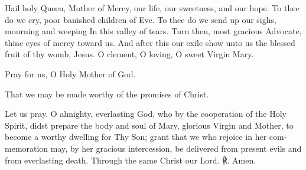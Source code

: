 \begin{otherlanguage}{english}\noindent Hail holy Queen, Mother of Mercy, 
our life, our sweetness, and our hope. 
To thee do we cry, poor banished children of Eve. 
To thee do we send up our sighs, mourning and weeping 
In this valley of tears. Turn then, most gracious Advocate, 
thine eyes of mercy toward us. 
And after this our exile show unto us 
the blessed fruit of thy womb, Jesus.
O clement, O loving, O sweet Virgin Mary.

\noindent \vv Pray for us, O Holy Mother of God.

\noindent \rr \hspace{-0.02em}That we may be made worthy of the promises of Christ.

\noindent Let us pray. O almighty, everlasting God, who by the cooperation of the Holy Spirit, didst prepare the body and soul of Mary, glorious Virgin and Mother, to become a worthy dwelling for Thy Son; grant that we who rejoice in her commemoration may, by her gracious intercession, be delivered from present evils and from everlasting death. Through the same Christ our Lord. ℟. Amen.
\end{otherlanguage}